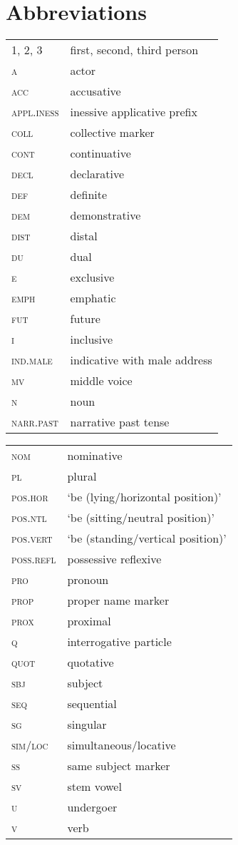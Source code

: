 \documentclass[output=paper]{langsci/langscibook}
\begin{document}
\section*{Abbreviations}
\begin{tabularx}{.5\textwidth}{@{}>{\scshape}lQ} 
1, 2, 3 & first, second, third person\\
a &   actor\\ 
acc &   accusative\\
appl.iness & inessive {applicative} prefix\\ 
coll &   collective marker\\ 
cont &  {continuative}\\ 
decl &   declarative\\ 
def &   definite\\ 
dem &   {demonstrative}\\ 
dist &   {distal}\\ 
du &   dual\\ 
e &   exclusive\\ 
emph &    emphatic\\ 
fut &   future\\ 
i &   inclusive\\ 
ind.male & indicative with male address\\ 
mv &   middle voice\\ 
n &   noun\\ 
narr.past & narrative {past tense}\\ 
\end{tabularx}
\begin{tabularx}{.5\textwidth}{>{\scshape}lQ@{}} 
nom &   {nominative}\\ 
pl &   plural\\ 
pos.hor & `be (lying\slash horizontal position)'\\ 
pos.ntl & `be (sitting\slash neutral position)'\\ 
pos.vert & `be (standing\slash vertical position)'\\ 
poss.refl & {possessive} reflexive\\ 
pro &   pronoun\\ 
prop &   proper name marker\\ 
prox &   {proximal}\\ 
q &   interrogative particle\\ 
quot &   quotative\\
sbj &   subject\\ 
seq &   sequential\\ 
sg &   singular\\ 
sim/loc & simultaneous/{locative}\\
ss &   same subject marker\\ 
sv &   stem vowel\\ 
u &   undergoer\\ 
v &   verb\\ 
\end{tabularx}  
 
{\sloppy\printbibliography[heading=subbibliography,notkeyword=this]}
\end{document}
